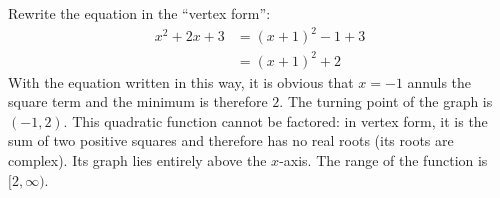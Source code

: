 Rewrite the equation in the ``vertex form'':
\begin{align*}
x^2 + 2x + 3 
  & = (x + 1)^2 -1 + 3 \\
  & = (x + 1)^2 + 2 
\end{align*}
With the equation written in this way, it is obvious that $x=-1$ annuls the square term and the minimum is therefore $2$. The turning point of the graph is $(-1, 2)$. This quadratic function cannot be factored: in vertex form, it is the sum of two positive squares and therefore has no real roots (its roots are complex). Its graph lies entirely above the $x$-axis. The range of the function is $[2, \infty)$.
